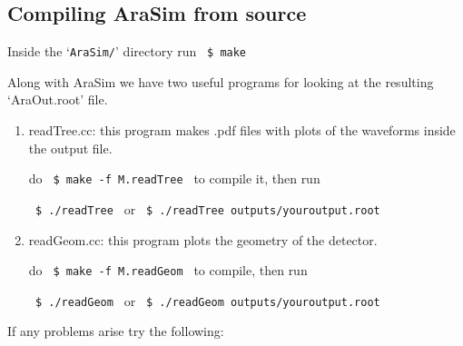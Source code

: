 \documentclass[a4paper,10pt]{article}
\newcommand{\room}{\vspace{0.3cm}}
\newcommand{\arasim}{AraSim\xspace}
\begin{document}
\subsection{Compiling AraSim from source}

Inside the `\verb|AraSim/|' directory run \verb| $ make | 

\room

Along with \arasim we have two useful programs for looking at the resulting `AraOut.root' file. 

\begin{enumerate} 

 \item readTree.cc: this program makes .pdf files with plots of the waveforms inside the output file. 
 
 do \verb| $ make -f M.readTree | to compile it, then run 
 
 \verb| $ ./readTree | or \verb| $ ./readTree outputs/youroutput.root |
 
 \item readGeom.cc: this program plots the geometry of the detector. 
 
 do \verb| $ make -f M.readGeom | to compile, then run
 
 \verb| $ ./readGeom | or \verb| $ ./readGeom outputs/youroutput.root |
 
\end{enumerate}


If any problems arise try the following:
\end{document}
